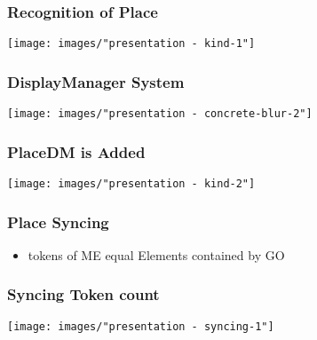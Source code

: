 \begin{frame}
  \frametitle{Recognition of Place}
  \hspace{-1cm}
  \texttt{[image: images/"presentation - kind-1"]}
\end{frame}

\begin{frame}
  \frametitle{DisplayManager System}
  \hspace{-1cm}
  \texttt{[image: images/"presentation - concrete-blur-2"]}
\end{frame}

\begin{frame}
  \frametitle{PlaceDM is Added}
  \hspace{-1cm}
  \texttt{[image: images/"presentation - kind-2"]}
\end{frame}




\begin{frame}
  \frametitle{Place Syncing}
  \begin{itemize}
    \item tokens of ME equal Elements contained by GO
  \end{itemize}
\end{frame}

\begin{frame}
  \frametitle{Syncing Token count}
  \hspace{-1cm}
  \texttt{[image: images/"presentation - syncing-1"]}
\end{frame}



